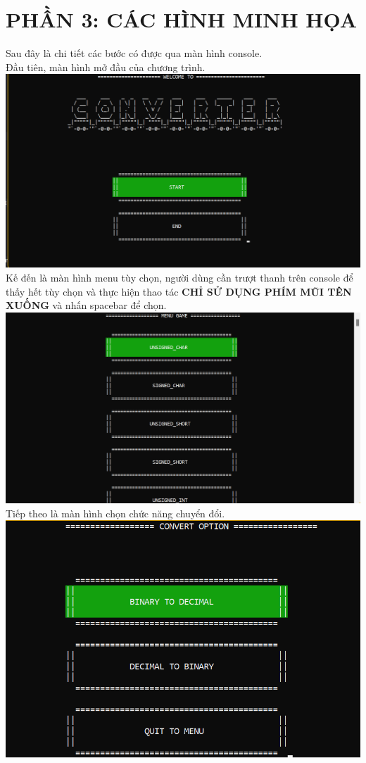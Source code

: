 \documentclass[12pt,a4paper]{article}
\begin{document}
\section{\textbf{\color{red}PHẦN 3: CÁC HÌNH MINH HỌA}}
\Large Sau đây là chi tiết các bước có được qua màn hình console. \\
\Large Đầu tiên, màn hình mở đầu của chương trình. \\
\includegraphics[scale=0.3]{picture/1.png} \\
\Large Kế đến là màn hình menu tùy chọn, người dùng cần trượt thanh trên console để thấy hết tùy chọn và thực hiện thao tác  \color{red}\textbf{CHỈ SỬ DỤNG PHÍM MŨI TÊN XUỐNG }\color{black} và nhấn spacebar để chọn.\\
\includegraphics[scale=0.6]{picture/2.png} \\
\Large Tiếp theo là màn hình chọn chức năng chuyển đổi.\\
\includegraphics[scale=0.7]{picture/3.png} \\
\end{document}
